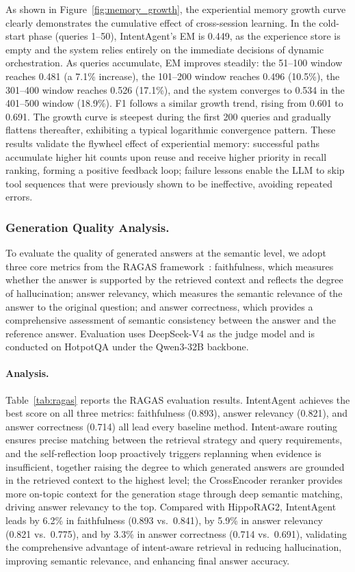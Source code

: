 \documentclass[runningheads]{llncs}
\begin{document}
As shown in Figure~\ref{fig:memory_growth}, the experiential memory growth curve clearly demonstrates the cumulative effect of cross-session learning. In the cold-start phase (queries 1--50), IntentAgent's EM is 0.449, as the experience store is empty and the system relies entirely on the immediate decisions of dynamic orchestration. As queries accumulate, EM improves steadily: the 51--100 window reaches 0.481 (a 7.1\% increase), the 101--200 window reaches 0.496 (10.5\%), the 301--400 window reaches 0.526 (17.1\%), and the system converges to 0.534 in the 401--500 window (18.9\%). F1 follows a similar growth trend, rising from 0.601 to 0.691. The growth curve is steepest during the first 200 queries and gradually flattens thereafter, exhibiting a typical logarithmic convergence pattern. These results validate the flywheel effect of experiential memory: successful paths accumulate higher hit counts upon reuse and receive higher priority in recall ranking, forming a positive feedback loop; failure lessons enable the LLM to skip tool sequences that were previously shown to be ineffective, avoiding repeated errors.

\subsubsection{Generation Quality Analysis.}

To evaluate the quality of generated answers at the semantic level, we adopt three core metrics from the RAGAS framework~\cite{ref29}: faithfulness, which measures whether the answer is supported by the retrieved context and reflects the degree of hallucination; answer relevancy, which measures the semantic relevance of the answer to the original question; and answer correctness, which provides a comprehensive assessment of semantic consistency between the answer and the reference answer. Evaluation uses DeepSeek-V4 as the judge model and is conducted on HotpotQA under the Qwen3-32B backbone.

\paragraph{Analysis.}

Table~\ref{tab:ragas} reports the RAGAS evaluation results. IntentAgent achieves the best score on all three metrics: faithfulness (0.893), answer relevancy (0.821), and answer correctness (0.714) all lead every baseline method. Intent-aware routing ensures precise matching between the retrieval strategy and query requirements, and the self-reflection loop proactively triggers replanning when evidence is insufficient, together raising the degree to which generated answers are grounded in the retrieved context to the highest level; the CrossEncoder reranker provides more on-topic context for the generation stage through deep semantic matching, driving answer relevancy to the top. Compared with HippoRAG2, IntentAgent leads by 6.2\% in faithfulness (0.893 vs.\ 0.841), by 5.9\% in answer relevancy (0.821 vs.\ 0.775), and by 3.3\% in answer correctness (0.714 vs.\ 0.691), validating the comprehensive advantage of intent-aware retrieval in reducing hallucination, improving semantic relevance, and enhancing final answer accuracy.
\end{document}
